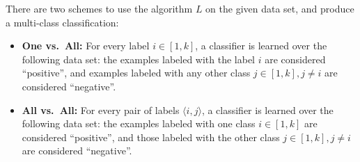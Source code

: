 \documentclass[12pt]{article}
\begin{document}
There are two schemes to use the algorithm $L$ on the given data set, and produce a multi-class classification:
\begin{itemize}
\item {\bf One vs.~All:} For every label $i \in [1,k]$, a classifier is learned over the following data set: the examples labeled with the label $i$ are considered ``positive'', and examples labeled with any other class $j \in [1,k], j \neq i$ are considered ``negative''.
\item {\bf All vs.~All:} For every pair of labels $\langle i, j \rangle$, a classifier is learned over the following data set: the examples labeled with one class $i \in [1,k]$ are considered ``positive'', and those labeled with the other class $j \in [1,k], j \neq i$ are considered ``negative''.
\end{itemize}
%
\vspace{-3mm}
\end{document}

